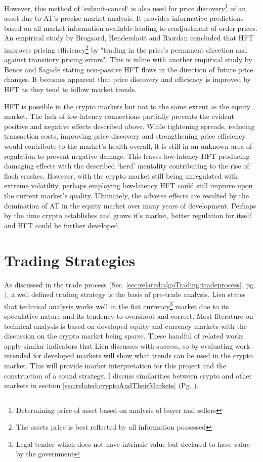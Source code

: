 However, this method of `submit-cancel` is also used for price discovery\footnote{Determining price of asset based on analysis of buyer and sellers} of an asset due to AT's precise market analysis. It provides informative predictions based on all market information available leading to readjustment of order prices. An empirical study by Brogaard, Hendershott and Riordan \cite{UNPUB:Brogaard:2017} concluded that HFT improves pricing efficiency\footnote{The assets price is best reflected by all information possessed} by "trading in the price's permanent direction and against transitory pricing errors". This is inline with another empirical study by Benos and Sagade \cite{ART:BENOS:2016} stating non-passive HFT flows in the direction of future price changes. It becomes apparent that price discovery and efficiency is improved by HFT as they tend to follow market trends.  

HFT is possible in the crypto markets but not to the same extent as the equity market. The lack of low-latency connections partially prevents the evident positive and negative effects described above. While tightening spreads, reducing transaction costs, improving price discovery and strengthening price efficiency would contribute to the market's health overall, it is still in an unknown area of regulation to prevent negative damage. This leaves low-latency HFT producing damaging effects with the described `herd' mentality contributing to the rise of flash crashes.  However, with the crypto market still being unregulated with extreme volatility, perhaps employing low-latency HFT could still improve upon the current market's quality. Ultimately, the adverse effects are resulted by the domination of AT in the equity market over many years of development. Perhaps by the time crypto establishes and grows it's market, better regulation for itself and HFT could be further developed.



\section{Trading Strategies}
\label{sec:related:tradingStrategies}
\noindent As discussed in the trade process (Sec. \ref{sec:related:algoTrading:tradeprocess}, pg. \pageref{sec:related:algoTrading:tradeprocess}), a well defined trading strategy is the basis of pre-trade analysis. Lien \cite{BOOK:Lien:2016} states that technical analysis works well in the fiat currency\footnote{Legal tender which does not have intrinsic value but declared to have value by the government} market due to its speculative nature and its tendency to overshoot and correct.  Most literature on technical analysis is based on developed equity and currency markets with the discussion on the crypto market being sparse. These handful of related works apply similar indicators that Lien discusses with success, so by evaluating work intended for developed markets will show what trends can be used in the crypto market. This will provide market interpretation for this project and the construction of a sound strategy. I discuss similarities between crypto and other markets in section \ref{sec:related:cryptoAndTheirMarkets} (Pg. \pageref{sec:related:cryptoAndTheirMarkets}).

